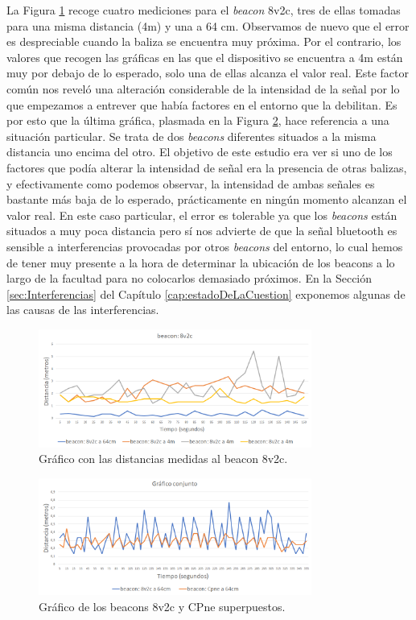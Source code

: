 La Figura \ref{fig:dist_8v2c} recoge cuatro mediciones para el \textit{beacon} 8v2c, tres de ellas tomadas para una misma distancia (4m) y una a 64 cm. Observamos de nuevo que el error es despreciable cuando la baliza se encuentra muy próxima. Por el contrario, los valores que recogen las gráficas en las que el dispositivo se encuentra a 4m están muy por debajo de lo esperado, solo una de ellas alcanza el valor real. Este factor común nos reveló una alteración considerable de la intensidad de la señal por lo que empezamos a entrever que había factores en el entorno que la debilitan. Es por esto que la última gráfica, plasmada en la Figura \ref{fig:dist_conjunto}, hace referencia a una situación particular. Se trata de dos \textit{beacons} diferentes situados a la misma distancia uno encima del otro. El objetivo de este estudio era ver si uno de los factores que podía alterar la intensidad de señal era la presencia de otras balizas, y efectivamente como podemos observar, la intensidad de ambas señales es bastante más baja de lo esperado, prácticamente en ningún momento alcanzan el valor real. En este caso particular, el error es tolerable ya que los \textit{beacons} están situados a muy poca distancia pero sí nos advierte de que la señal bluetooth es sensible a interferencias provocadas por otros \textit{beacons} del entorno, lo cual hemos de tener muy presente a la hora de determinar la ubicación de los beacons a lo largo de la facultad para no colocarlos demasiado próximos. En la Sección \ref{sec:Interferencias} del Capítulo \ref{cap:estadoDeLaCuestion} exponemos algunas de las causas de las interferencias.
\begin{figure}[t]
	\centering
	\includegraphics[width=0.8\textwidth]{Imagenes/Descripciondeltrabajo/dist_8v2c}
	\caption{Gráfico con las distancias medidas al beacon 8v2c. }
	\label{fig:dist_8v2c}
\end{figure}
\begin{figure}[t]
	\centering
	\includegraphics[width=0.8\textwidth]{Imagenes/Descripciondeltrabajo/dist_conjunto}
	\caption{Gráfico de los beacons 8v2c y CPne superpuestos. }
	\label{fig:dist_conjunto}
\end{figure}

